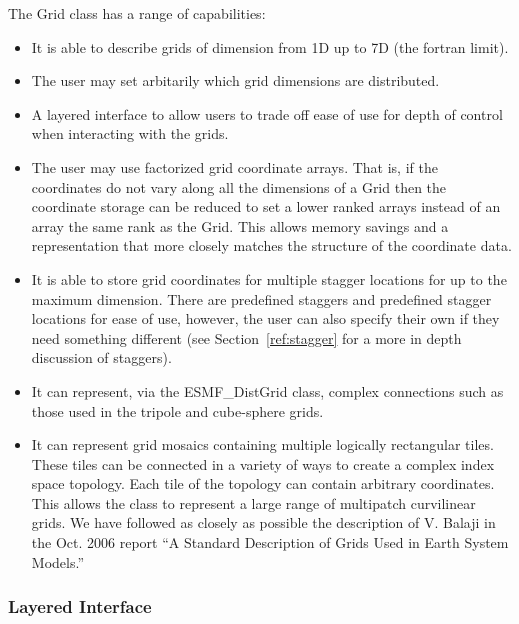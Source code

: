 The Grid class has a range of capabilities:
\begin{itemize}

\item It is able to describe grids of dimension from 1D up to 7D (the fortran limit).

\item The user may set arbitarily which grid dimensions are distributed. 

\item A layered interface to allow users to trade off ease of use
      for depth of control when interacting with the grids. 

\item The user may use factorized grid coordinate arrays. That is, if
      the coordinates do not vary along all the dimensions of a Grid
      then the coordinate storage can be reduced to set a lower
      ranked arrays instead of an array the same rank as the Grid.
      This allows memory savings and a representation that more
      closely matches the structure of the coordinate data. 

\item  It is able to store grid coordinates for multiple stagger locations for up to the maximum dimension. There are predefined staggers and predefined stagger locations for ease of use, however, the user can also specify their own if they need something different (see Section~\ref{ref:stagger} for a more in depth discussion of staggers).

\item It can represent, via the ESMF\_DistGrid class, complex connections such 
      as those used in the tripole and cube-sphere grids. 

\item It can represent grid mosaics containing multiple logically rectangular
tiles. These tiles can be connected in a variety of ways to create a complex index space topology. Each tile of the topology can contain arbitrary coordinates. This allows the class to represent a large range of multipatch curvilinear grids. We have followed as closely as possible the description of V. Balaji in the Oct. 2006 report ``A Standard Description of Grids Used in Earth System Models.'' 


\end{itemize}


\subsubsection{Layered Interface} 

